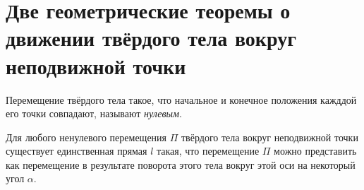 \section{Две геометрические теоремы о движении твёрдого тела вокруг неподвижной
точки}

\begin{definition}
  Перемещение твёрдого тела такое, что начальное и конечное положения кажддой
  его точки совпадают, называют \textit{нулевым}.
\end{definition}

\begin{theorem}
  \label{theorem:euler_d'alembert}
  Для любого ненулевого перемещения $\Pi$ твёрдого тела вокруг неподвижной точки
  существует единственная прямая $l$ такая, что перемещение $\Pi$ можно
  представить как перемещение в результате поворота этого тела вокруг этой оси
  на некоторый угол $\alpha$.
\end{theorem}

